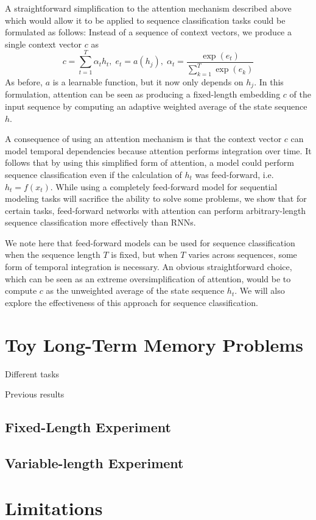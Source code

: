 \documentclass{article} %
\begin{document}
A straightforward simplification to the attention mechanism described above which would allow it to be applied to sequence classification tasks could be formulated as follows:
Instead of a sequence of context vectors, we produce a single context vector $c$ as
$$
c = \sum_{t = 1}^T \alpha_t h_t,\; e_t = a(h_j),\; \alpha_t = \frac{\exp(e_t)}{\sum_{k = 1}^T \exp(e_k)}
$$
As before, $a$ is a learnable function, but it now only depends on $h_j$.
In this formulation, attention can be seen as producing a fixed-length embedding $c$ of the input sequence by computing an adaptive weighted average of the state sequence $h$.

A consequence of using an attention mechanism is that the context vector $c$ can model temporal dependencies because attention performs integration over time.
It follows that by using this simplified form of attention, a model could perform sequence classification even if the calculation of $h_t$ was feed-forward, i.e.\ $h_t = f(x_t)$.
While using a completely feed-forward model for sequential modeling tasks will sacrifice the ability to solve some problems, we show that for certain tasks, feed-forward networks with attention can perform arbitrary-length sequence classification more effectively than RNNs.

We note here that feed-forward models can be used for sequence classification when the sequence length $T$ is fixed, but when $T$ varies across sequences, some form of temporal integration is necessary.
An obvious straightforward choice, which can be seen as an extreme oversimplification of attention, would be to compute $c$ as the unweighted average of the state sequence $h_t$.
We will also explore the effectiveness of this approach for sequence classification.

\section{Toy Long-Term Memory Problems}

Different tasks

Previous results

\subsection{Fixed-Length Experiment}

\subsection{Variable-length Experiment}

\section{Limitations}
\end{document}
